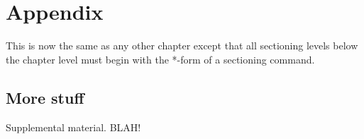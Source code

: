 \appendixtitle
\appendix
\chapter{Appendix}

This is now the same as any other chapter except that
all sectioning levels below the chapter level must begin
with the *-form of a sectioning command.

\section*{More stuff}
\label{AppendSection1}

Supplemental material. BLAH!